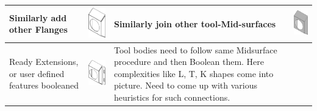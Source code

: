 \begin{longtable}{ L{0.18\textwidth} C{0.18\textwidth} L{0.38\textwidth}  C{0.18\textwidth}}
\hline
Similarly add other Flanges  &
\includegraphics[scale=0.23]{..//Common/images//DryRun5.png} &
Similarly join other tool-Mid-surfaces &
\includegraphics[scale=0.23]{..//Common/images//DryRun51.png} \\
\hline
Ready Extensions, or user defined features booleaned  &
\includegraphics[scale=0.23]{..//Common/images//DryRun6.png} &
Tool bodies need to follow same Midsurface procedure and then Boolean them. Here complexities like L, T, K shapes come into picture. Need to come up with various heuristics for such connections.  &

\end{longtable}
